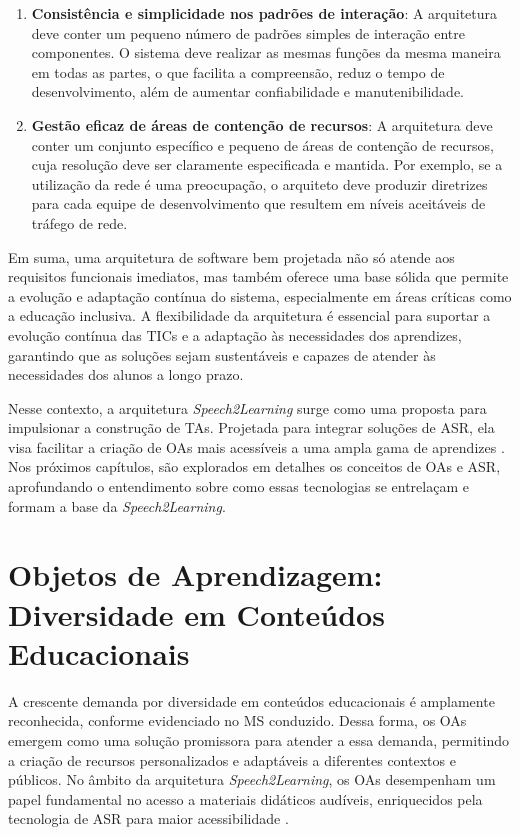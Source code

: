 \begin{enumerate}
    \item \textbf{Consistência e simplicidade nos padrões de interação}: A arquitetura deve conter um pequeno número de padrões simples de interação entre componentes. O sistema deve realizar as mesmas funções da mesma maneira em todas as partes, o que facilita a compreensão, reduz o tempo de desenvolvimento, além de aumentar confiabilidade e manutenibilidade.
    
    \item \textbf{Gestão eficaz de áreas de contenção de recursos}: A arquitetura deve conter um conjunto específico e pequeno de áreas de contenção de recursos, cuja resolução deve ser claramente especificada e mantida. Por exemplo, se a utilização da rede é uma preocupação, o arquiteto deve produzir diretrizes para cada equipe de desenvolvimento que resultem em níveis aceitáveis de tráfego de rede.
\end{enumerate}

Em suma, uma arquitetura de software bem projetada não só atende aos requisitos funcionais imediatos, mas também oferece uma base sólida que permite a evolução e adaptação contínua do sistema, especialmente em áreas críticas como a educação inclusiva. A flexibilidade da arquitetura é essencial para suportar a evolução contínua das TICs e a adaptação às necessidades dos aprendizes, garantindo que as soluções sejam sustentáveis e capazes de atender às necessidades dos alunos a longo prazo.

Nesse contexto, a arquitetura \textit{Speech2Learning} surge como uma proposta para impulsionar a construção de TAs. Projetada para integrar soluções de ASR, ela visa facilitar a criação de OAs mais acessíveis a uma ampla gama de aprendizes \cite{FalvoJr2023_HICSS}. Nos próximos capítulos, são explorados em detalhes os conceitos de OAs e ASR, aprofundando o entendimento sobre como essas tecnologias se entrelaçam e formam a base da \textit{Speech2Learning}.

\section{Objetos de Aprendizagem: Diversidade em Conteúdos Educacionais}
\label{section:foundation:lo}

A crescente demanda por diversidade em conteúdos educacionais é amplamente reconhecida, conforme evidenciado no MS conduzido. Dessa forma, os OAs emergem como uma solução promissora para atender a essa demanda, permitindo a criação de recursos personalizados e adaptáveis a diferentes contextos e públicos. No âmbito da arquitetura \textit{Speech2Learning}, os OAs desempenham um papel fundamental no acesso a materiais didáticos audíveis, enriquecidos pela tecnologia de ASR para maior acessibilidade \cite{FalvoJr2023_HICSS}.


